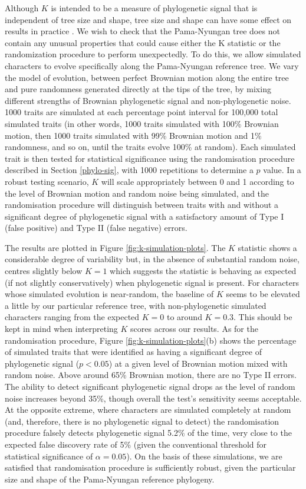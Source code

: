 Although \(K\) is intended to be a measure of phylogenetic signal that is independent of tree size and shape, tree size and shape can have some effect on results in practice \autocite{munkemuller_how_2012}. We wish to check that the Pama-Nyungan tree does not contain any unusual properties that could cause either the K statistic or the randomization procedure to perform unexpectedly. To do this, we allow simulated characters to evolve specifically along the Pama-Nyungan reference tree. We vary the model of evolution, between perfect Brownian motion along the entire tree and pure randomness generated directly at the tips of the tree, by mixing different strengths of Brownian phylogenetic signal and non-phylogenetic noise. 1000 traits are simulated at each percentage point interval for 100,000 total simulated traits (in other words, 1000 traits simulated with 100\% Brownian motion, then 1000 traits simulated with 99\% Brownian motion and 1\% randomness, and so on, until the traits evolve 100\% at random). Each simulated trait is then tested for statistical significance using the randomisation procedure described in Section \ref{phylo-sig}, with 1000 repetitions to determine a \(p\) value. In a robust testing scenario, \(K\) will scale appropriately between 0 and 1 according to the level of Brownian motion and random noise being simulated, and the randomisation procedure will distinguish between traits with and without a significant degree of phylogenetic signal with a satisfactory amount of Type I (false positive) and Type II (false negative) errors.

The results are plotted in Figure \ref{fig:k-simulation-plots}. The \(K\) statistic shows a considerable degree of variability but, in the absence of substantial random noise, centres slightly below \(K=1\) which suggests the statistic is behaving as expected (if not slightly conservatively) when phylogenetic signal is present. For characters whose simulated evolution is near-random, the baseline of \(K\) seems to be elevated a little by our particular reference tree, with non-phylogenetic simulated characters ranging from the expected \(K=0\) to around \(K=0.3\). This should be kept in mind when interpreting \(K\) scores across our results. As for the randomisation procedure, Figure \ref{fig:k-simulation-plots}(b) shows the percentage of simulated traits that were identified as having a significant degree of phylogenetic signal (\(p < 0.05\)) at a given level of Brownian motion mixed with random noise. Above around 65\% Brownian motion, there are no Type II errors. The ability to detect significant phylogenetic signal drops as the level of random noise increases beyond 35\%, though overall the test's sensitivity seems acceptable. At the opposite extreme, where characters are simulated completely at random (and, therefore, there is no phylogenetic signal to detect) the randomisation procedure falsely detects phylogenetic signal 5.2\% of the time, very close to the expected false discovery rate of 5\% (given the conventional threshold for statistical significance of \(\alpha = 0.05\)). On the basis of these simulations, we are satisfied that randomisation procedure is sufficiently robust, given the particular size and shape of the Pama-Nyungan reference phylogeny.

